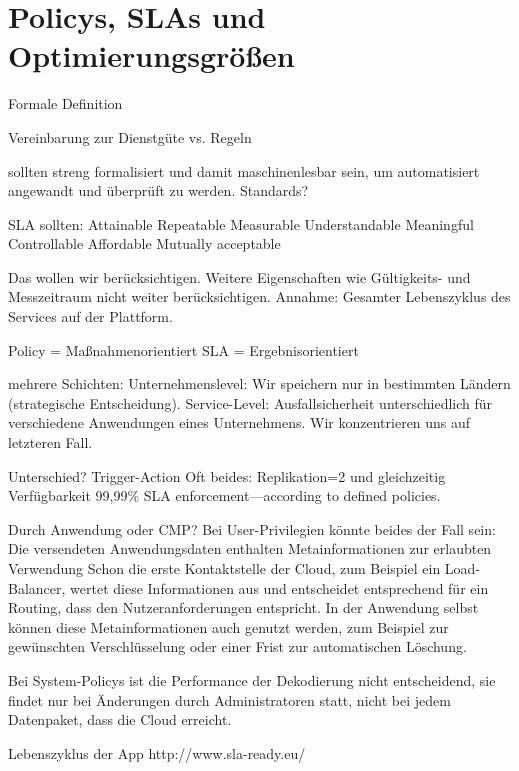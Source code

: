 

\section{Policys, SLAs und Optimierungsgrößen}

Formale Definition

Vereinbarung zur Dienstgüte vs. Regeln

sollten streng formalisiert und damit maschinenlesbar sein, um automatisiert angewandt und überprüft zu werden.
Standards?

SLA sollten:
Attainable
Repeatable
Measurable
Understandable
Meaningful
Controllable
Affordable
Mutually acceptable

Das wollen wir berücksichtigen. Weitere Eigenschaften wie Gültigkeits- und Messzeitraum nicht weiter berücksichtigen. Annahme: Gesamter Lebenszyklus des Services auf der Plattform.



Policy = Maßnahmenorientiert 
SLA = Ergebnisorientiert  

mehrere Schichten: Unternehmenslevel: Wir speichern nur in bestimmten Ländern (strategische Entscheidung). Service-Level: Ausfallsicherheit unterschiedlich für verschiedene Anwendungen eines Unternehmens. Wir konzentrieren uns auf letzteren Fall.

Unterschied? Trigger-Action
Oft beides: Replikation=2 und gleichzeitig Verfügbarkeit 99,99\%
 SLA enforcement—according to defined policies.

Durch Anwendung oder CMP? Bei User-Privilegien könnte beides der Fall sein: Die versendeten Anwendungsdaten enthalten Metainformationen zur erlaubten Verwendung Schon die erste Kontaktstelle der Cloud, zum Beispiel ein Load-Balancer, wertet diese Informationen aus und entscheidet entsprechend für ein Routing, dass den Nutzeranforderungen entspricht. In der Anwendung selbst können diese Metainformationen auch genutzt werden, zum Beispiel zur gewünschten Verschlüsselung oder einer Frist zur automatischen Löschung.

Bei System-Policys ist die Performance der Dekodierung nicht entscheidend, sie findet nur bei Änderungen durch Administratoren statt, nicht bei jedem Datenpaket, dass die Cloud erreicht.

Lebenszyklus der App
http://www.sla-ready.eu/


